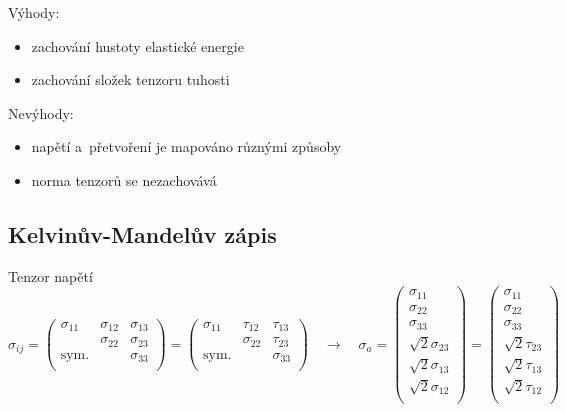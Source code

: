 Výhody:
\begin{itemize}
	\item zachování hustoty elastické energie
	\item zachování složek tenzoru tuhosti
\end{itemize}

Nevýhody:
\begin{itemize}
	\item napětí a~přetvoření je mapováno různými způsoby
	\item norma tenzorů se nezachovává
\end{itemize}

\subsection{Kelvinův-Mandelův zápis}
Tenzor napětí
\begin{equation*}
\sigma_{ij} =
\begin{pmatrix}
\sigma_{11} & \sigma_{12} & \sigma_{13} \\ & \sigma_{22} & \sigma_{23} \\ \text{sym.} & & \sigma_{33} \\
\end{pmatrix} =
\begin{pmatrix}
\sigma_{11} & \tau_{12} & \tau_{13} \\ & \sigma_{22} & \tau_{23} \\ \text{sym.} & & \sigma_{33} \\
\end{pmatrix}
\quad\rightarrow\quad
\sigma_a =
\begin{pmatrix}
\sigma_{11} \\ \sigma_{22} \\ \sigma_{33} \\ \sqrt{2} \sigma_{23} \\ \sqrt{2} \sigma_{13} \\ \sqrt{2} \sigma_{12} \\
\end{pmatrix} =
\begin{pmatrix}
\sigma_{11} \\ \sigma_{22} \\ \sigma_{33} \\ \sqrt{2} \tau_{23} \\ \sqrt{2} \tau_{13} \\ \sqrt{2} \tau_{12} \\
\end{pmatrix}
\end{equation*}


